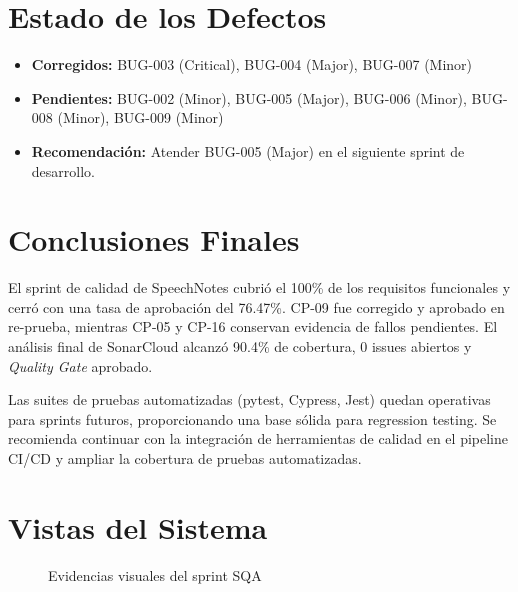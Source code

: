 \section{Estado de los Defectos}

\begin{itemize}
    \item \textbf{Corregidos:} BUG-003 (Critical), BUG-004 (Major), BUG-007 (Minor)
    \item \textbf{Pendientes:} BUG-002 (Minor), BUG-005 (Major), BUG-006 (Minor), BUG-008 (Minor), BUG-009 (Minor)
    \item \textbf{Recomendación:} Atender BUG-005 (Major) en el siguiente sprint de desarrollo.
\end{itemize}

\section{Conclusiones Finales}

El sprint de calidad de SpeechNotes cubrió el 100\% de los requisitos funcionales y cerró con una tasa de aprobación del 76.47\%. CP-09 fue corregido y aprobado en re-prueba, mientras CP-05 y CP-16 conservan evidencia de fallos pendientes. El análisis final de SonarCloud alcanzó 90.4\% de cobertura, 0 issues abiertos y \textit{Quality Gate} aprobado.

Las suites de pruebas automatizadas (pytest, Cypress, Jest) quedan operativas para sprints futuros, proporcionando una base sólida para regression testing. Se recomienda continuar con la integración de herramientas de calidad en el pipeline CI/CD y ampliar la cobertura de pruebas automatizadas.

\section{Vistas del Sistema}

\begin{figure}[H]
\centering
{}
\caption{Evidencias visuales del sprint SQA}
\label{fig:evidencias}
\end{figure}
